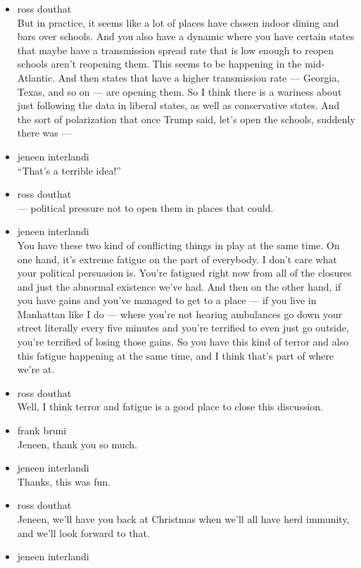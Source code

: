 \begin{itemize}
\item
  ross douthat\\
  But in practice, it seems like a lot of places have chosen indoor
  dining and bars over schools. And you also have a dynamic where you
  have certain states that maybe have a transmission spread rate that is
  low enough to reopen schools aren't reopening them. This seems to be
  happening in the mid-Atlantic. And then states that have a higher
  transmission rate --- Georgia, Texas, and so on --- are opening them.
  So I think there is a wariness about just following the data in
  liberal states, as well as conservative states. And the sort of
  polarization that once Trump said, let's open the schools, suddenly
  there was ---
\item
  jeneen interlandi\\
  ``That's a terrible idea!''
\item
  ross douthat\\
  --- political pressure not to open them in places that could.
\item
  jeneen interlandi\\
  You have these two kind of conflicting things in play at the same
  time. On one hand, it's extreme fatigue on the part of everybody. I
  don't care what your political persuasion is. You're fatigued right
  now from all of the closures and just the abnormal existence we've
  had. And then on the other hand, if you have gains and you've managed
  to get to a place --- if you live in Manhattan like I do --- where
  you're not hearing ambulances go down your street literally every five
  minutes and you're terrified to even just go outside, you're terrified
  of losing those gains. So you have this kind of terror and also this
  fatigue happening at the same time, and I think that's part of where
  we're at.
\item
  ross douthat\\
  Well, I think terror and fatigue is a good place to close this
  discussion.
\item
  frank bruni\\
  Jeneen, thank you so much.
\item
  jeneen interlandi\\
  Thanks, this was fun.
\item
  ross douthat\\
  Jeneen, we'll have you back at Christmas when we'll all have herd
  immunity, and we'll look forward to that.
\item
  jeneen interlandi\\

\end{itemize}
